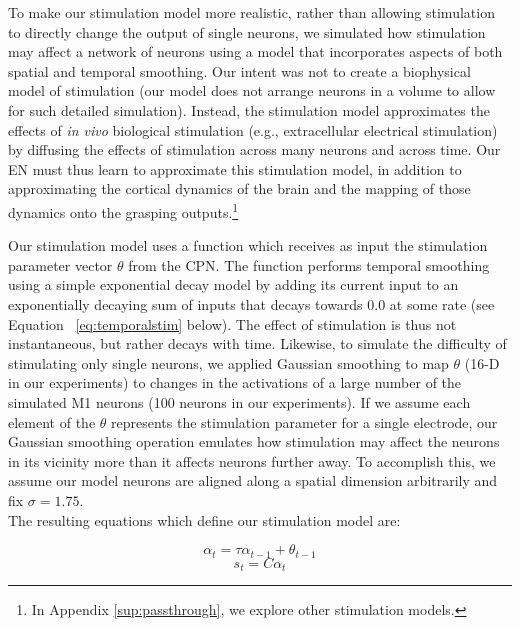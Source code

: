 \documentclass[12pt]{iopart}
\begin{document}
To make our stimulation model more realistic, rather than allowing stimulation to directly change the
output of single neurons, we simulated how stimulation may affect a network of neurons using a
model that incorporates aspects of both spatial and temporal smoothing. Our intent was not to create a
biophysical model of stimulation (our model does not arrange neurons in a volume to allow for such detailed
simulation). Instead, the stimulation model approximates the effects of \textit{in vivo} biological
stimulation (e.g., extracellular electrical stimulation) by diffusing the effects of stimulation across
many neurons and across time. Our EN must thus learn to approximate this stimulation model,
in addition to approximating the cortical dynamics of the brain and the mapping of those dynamics onto
the grasping outputs.\footnote{In Appendix \ref{sup:passthrough}, we explore
other stimulation models.}

Our stimulation model uses a function which receives as input the stimulation parameter
vector $\theta$ from the CPN. The function performs temporal smoothing using a simple exponential decay model by
adding its current input to an exponentially decaying sum of inputs that decays towards $0.0$ at some
rate (see Equation ~\ref{eq:temporalstim} below). The effect of stimulation is thus not instantaneous,
but rather decays with time. Likewise, to simulate the difficulty of stimulating only single neurons,
we applied Gaussian smoothing to map $\theta$ (16-D in our experiments) to changes in the activations of
a large number of the simulated M1 neurons (100 neurons in our experiments). If we assume each element
of the $\theta$ represents the stimulation parameter for a single electrode, our Gaussian smoothing
operation emulates how stimulation may affect the neurons in its vicinity more than it affects neurons
further away. To accomplish this, we assume our model neurons are aligned along a spatial dimension
arbitrarily and fix $\sigma=1.75$.\\

\noindent The resulting equations which define our stimulation model are:

\begin{equation}
\alpha_{t} = \tau\alpha_{t-1} + \theta_{t-1} \label{eq:temporalstim}
\end{equation}
\begin{equation}
s_{t} = C\alpha_{t}
\end{equation}
\end{document}
